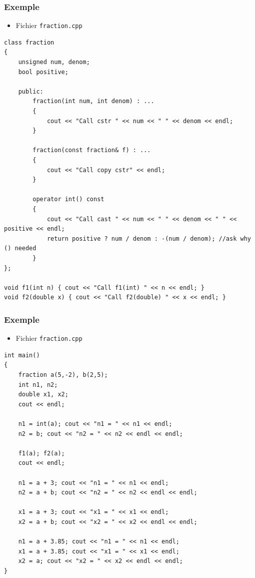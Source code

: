 \begin{frame}[containsverbatim]
\frametitle{Exemple}
\begin{itemize}
\item Fichier \texttt{fraction.cpp}
\end{itemize}
\begin{lstlisting}
class fraction
{
	unsigned num, denom;
	bool positive;

	public:
		fraction(int num, int denom) : ...
		{
			cout << "Call cstr " << num << " " << denom << endl;
		}		

		fraction(const fraction& f) : ...
		{
			cout << "Call copy cstr" << endl;
		}

		operator int() const
		{
			cout << "Call cast " << num << " " << denom << " " << positive << endl;
			return positive ? num / denom : -(num / denom); //ask why () needed
		}
};

void f1(int n) { cout << "Call f1(int) " << n << endl; }
void f2(double x) { cout << "Call f2(double) " << x << endl; }
\end{lstlisting}
\end{frame}

\begin{frame}[containsverbatim]
\frametitle{Exemple}
\begin{itemize}
\item Fichier \texttt{fraction.cpp}
\end{itemize}
\begin{lstlisting}
int main()
{
	fraction a(5,-2), b(2,5);
	int n1, n2;
	double x1, x2;
	cout << endl;

	n1 = int(a); cout << "n1 = " << n1 << endl;
	n2 = b; cout << "n2 = " << n2 << endl << endl;

	f1(a); f2(a);
	cout << endl;

	n1 = a + 3; cout << "n1 = " << n1 << endl;
	n2 = a + b; cout << "n2 = " << n2 << endl << endl;

	x1 = a + 3; cout << "x1 = " << x1 << endl;
	x2 = a + b; cout << "x2 = " << x2 << endl << endl;
	
	n1 = a + 3.85; cout << "n1 = " << n1 << endl;
	x1 = a + 3.85; cout << "x1 = " << x1 << endl;
	x2 = a; cout << "x2 = " << x2 << endl << endl;	
}
\end{lstlisting}
\end{frame}

